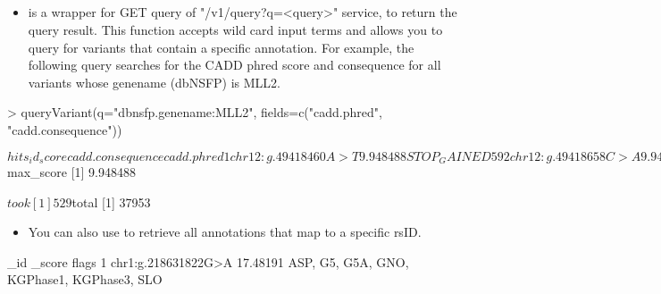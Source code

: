 \documentclass[12pt]{article}
\begin{document}
\subsection{}

\begin{itemize}
\item {} is a wrapper for GET query of "/v1/query?q=<query>" service, to return  the query result. This function accepts wild card input terms and allows you to query for variants that contain a specific annotation. For example, the following query searches for the CADD phred score and consequence for all variants whose genename (dbNSFP) is MLL2.
\end{itemize}



\begin{Schunk}
\begin{Sinput}
> queryVariant(q="dbnsfp.genename:MLL2", fields=c("cadd.phred", "cadd.consequence"))
\end{Sinput}
\begin{Soutput}
$hits
                   _id   _score cadd.consequence cadd.phred
1  chr12:g.49418460A>T 9.948488      STOP_GAINED         59
2  chr12:g.49418658C>A 9.948488      STOP_GAINED         57
3  chr12:g.49420281G>T 9.948488      STOP_GAINED         59
4  chr12:g.49420340T>A 9.948488      STOP_GAINED         53
5  chr12:g.49420364T>A 9.948488      STOP_GAINED         53
6  chr12:g.49420844C>A 9.948488      STOP_GAINED         53
7  chr12:g.49420888G>C 9.948488      STOP_GAINED         53
8  chr12:g.49421602A>T 9.948488      STOP_GAINED         53
9  chr12:g.49421807C>A 9.948488      STOP_GAINED         57
10 chr12:g.49422661T>A 9.948488      STOP_GAINED         45

$max_score
[1] 9.948488

$took
[1] 529

$total
[1] 37953
\end{Soutput}
\end{Schunk}

\begin{itemize}
\item You can also use  to retrieve all annotations that map to a specific rsID.
\end{itemize}

\begin{Schunk}
\begin{Soutput}
                  _id   _score                                      flags
1 chr1:g.218631822G>A 17.48191 ASP, G5, G5A, GNO, KGPhase1, KGPhase3, SLO
\end{Soutput}
\end{Schunk}
\end{document}
